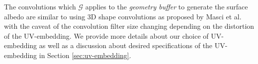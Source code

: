 The convolutions which $\mathcal{G}$ applies to the \emph{geometry buffer} to generate the
surface albedo are similar to using 3D shape convolutions as proposed by Masci et al. 
\cite{masci2015shapenet} with the caveat of the convolution filter size changing depending on
the distortion of the UV-embedding. We provide more details about our choice of UV-embedding
as well as a discussion about desired specifications of the UV-embedding in Section
\ref{sec:uv-embedding}.